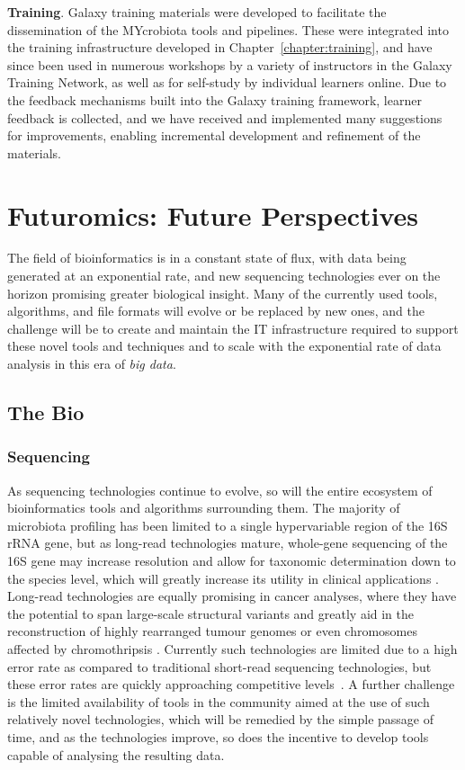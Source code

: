\textbf{Training}. Galaxy training materials were developed to facilitate the dissemination of the MYcrobiota tools and pipelines. These were integrated into the training infrastructure developed in Chapter~\ref{chapter:training}, and have since been used in numerous workshops by a variety of instructors in the Galaxy Training Network, as well as for self-study by individual learners online. Due to the feedback mechanisms built into the Galaxy training framework, learner feedback is collected, and we have received and implemented many suggestions for improvements, enabling incremental development and refinement of the materials.


\section{Futuromics: Future Perspectives}

The field of bioinformatics is in a constant state of flux, with data being generated at an exponential rate, and new sequencing technologies ever on the horizon promising greater biological insight. Many of the currently used tools, algorithms, and file formats will evolve or be replaced by new ones, and the challenge will be to create and maintain the IT infrastructure required to support these novel tools and techniques and to scale with the exponential rate of data analysis in this era of \emph{big data}.

\subsection{The Bio}

\subsubsection{Sequencing}
As sequencing technologies continue to evolve, so will the entire ecosystem of bioinformatics tools and algorithms surrounding them.
The majority of  microbiota profiling has been limited to a single hypervariable region of the 16S rRNA gene, but as long-read technologies mature, whole-gene sequencing of the 16S gene may increase resolution and allow for taxonomic determination down to the species level, which will greatly increase its utility in clinical applications \cite{toma2014single,franzen2015improved}.
Long-read technologies are equally promising in cancer analyses, where they have the potential to span large-scale structural variants and greatly aid in the reconstruction of highly rearranged tumour genomes or even chromosomes affected by chromothripsis \cite{norris2016nanopore,nattestad2018complex}.
Currently such technologies are limited due to a high error rate as compared to traditional short-read sequencing technologies, but these error rates are quickly approaching competitive levels~\cite{kraft2019long}.
A further challenge is the limited availability of tools in the community aimed at the use of such relatively novel technologies, which will be remedied by the simple passage of time, and as the technologies improve, so does the incentive to develop tools capable of analysing the resulting data.

